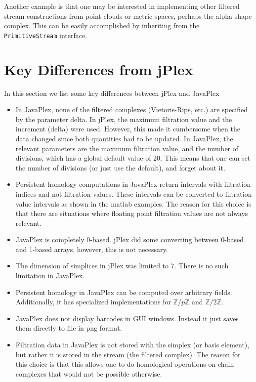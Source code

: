 Another example is that one may be interested in implementing other filtered stream constructions from point clouds or metric spaces, perhaps the alpha-shape complex. This can be easily accomplished by inheriting from the {\tt PrimitiveStream} interface.

\section{Key Differences from jPlex}

In this section we list some key differences between jPlex and JavaPlex

\begin{itemize}
\item In JavaPlex, none of the filtered complexes (Vietoris-Rips, etc.) are specified by the parameter delta. In jPlex, the maximum filtration value and the increment (delta) were used. However, this made it cumbersome when the data changed since both quantities had to be updated. In JavaPlex, the relevant parameters are the maximum filtration value, and the number of divisions, which has a global default value of 20. This means that one can set the number of divisions (or just use the default), and forget about it.
\item Persistent homology computations in JavaPlex return intervals with filtration indices and not filtration values. These intervals can be converted to filtration value intervals as shown in the matlab examples. The reason for this choice is that there are situations where floating point filtration values are not always relevant.
\item JavaPlex is completely 0-based. jPlex did some converting between 0-based and 1-based arrays, however, this is not necessary.
\item The dimension of simplices in jPlex was limited to 7. There is no such limitation in JavaPlex.
\item Persistent homology in JavaPlex can be computed over arbitrary fields. Additionally, it has specialized implementations for $\mathbb{Z}/p\mathbb{Z}$ and $\mathbb{Z}/2\mathbb{Z}$.
\item JavaPlex does not display barcodes in GUI windows. Instead it just saves them directly to file in png format.
\item Filtration data in JavaPlex is not stored with the simplex (or basis element), but rather it is stored in the stream (the filtered complex). The reason for this choice is that this allows one to do homological operations on chain complexes that would not be possible otherwise. 
\end{itemize}

